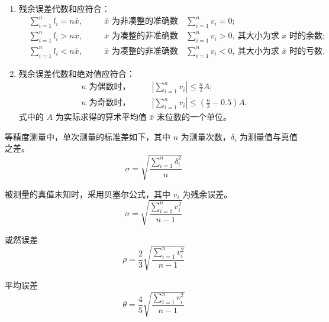\documentclass[12pt,a4paper]{ctexart}
\begin{document}
\begin{enumerate}
    \item 残余误差代数和应符合：
    \begin{equation*}
    \begin{alignedat}{3}
        &\sum_{i=1}^{n} l_i = n\bar{x},\quad
        &&\bar{x}\text{ 为非凑整的准确数时，}\quad
        &&\sum_{i=1}^{n} v_i = 0;\\
        &\sum_{i=1}^{n} l_i > n\bar{x},\quad
        &&\bar{x}\text{ 为凑整的非准确数时，}\quad
        &&\sum_{i=1}^{n} v_i > 0,\ \text{其大小为求 }\bar{x}\text{ 时的余数};\\
        &\sum_{i=1}^{n} l_i < n\bar{x},\quad
        &&\bar{x}\text{ 为凑整的非准确数时，}\quad
        &&\sum_{i=1}^{n} v_i < 0,\ \text{其大小为求 }\bar{x}\text{ 时的亏数}.
    \end{alignedat}
    \end{equation*}

    \item 残余误差代数和绝对值应符合：
    \begin{equation*}
    \begin{alignedat}{2}
        &n\text{ 为偶数时，}\quad
        &&\left|\sum_{i=1}^{n} v_i\right| \leq \frac{n}{2}A;\\
        &n\text{ 为奇数时，}\quad
        &&\left|\sum_{i=1}^{n} v_i\right| \leq \left(\frac{n}{2}-0.5\right)A.
    \end{alignedat}
    \end{equation*}
    式中的 $A$ 为实际求得的算术平均值 $\bar{x}$ 末位数的一个单位。
\end{enumerate}

等精度测量中，单次测量的标准差如下，其中 $n$ 为测量次数，$\delta_i$ 为测量值与真值之差。
\begin{equation*}
\sigma=\sqrt{\frac{\sum_{i=1}^{n}\delta_i^2}{n}}
\end{equation*}

被测量的真值未知时，采用贝塞尔公式，其中 $v_i$ 为残余误差。
\begin{equation*}
\sigma=\sqrt{\frac{\sum_{i=1}^{n}v_i^2}{n-1}}
\end{equation*}

或然误差
\begin{equation*}
\rho=\frac{2}{3}\sqrt{\frac{\sum_{i=1}^{n}v_i^2}{n-1}}
\end{equation*}

平均误差
\begin{equation*}
\theta=\frac{4}{5}\sqrt{\frac{\sum_{i=1}^{n}v_i^2}{n-1}}
\end{equation*}
\end{document}
